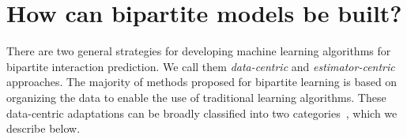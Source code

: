 

\section{How can bipartite models be built?}
\label{sec:approaches}

There are two general strategies for developing machine learning algorithms for bipartite interaction prediction. We call them \emph{data-centric} and \emph{estimator-centric} approaches.
%
The majority of methods proposed for bipartite learning is based on organizing the data to enable the use of traditional learning algorithms.
These data-centric adaptations can be broadly classified into two categories~\cite{schrynemackers2015classifying,pliakos2018global,pliakos2020drugtarget}, which we describe below.

